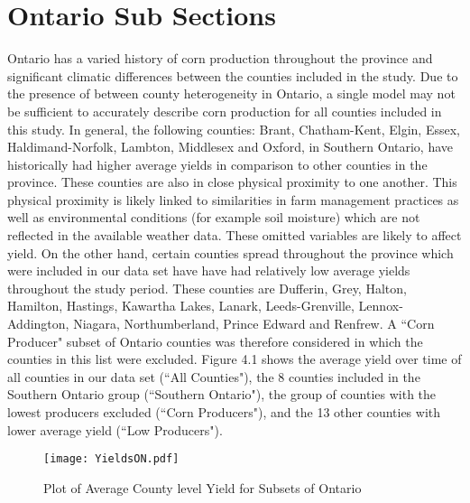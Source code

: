 \section{Ontario Sub Sections}


Ontario has a varied history of corn production throughout the province and significant climatic differences between the counties included in the study\citep{tolhurst2015cold}. Due to the presence of between county heterogeneity in Ontario, a single model may not be sufficient to accurately describe corn production for all counties included in this study. In general, the following counties: Brant, Chatham-Kent, Elgin, Essex, Haldimand-Norfolk, Lambton, Middlesex and Oxford, in Southern Ontario, have historically had higher average yields in comparison to other counties in the province. These counties are also in close physical proximity to one another. This physical proximity is likely linked to similarities in  farm management practices as well as environmental conditions (for example soil moisture) which are not reflected in the available weather data. These omitted variables are likely to affect yield. On the other hand, certain counties spread throughout the province which were included in our data set have have had relatively low average yields throughout the study period. These counties are Dufferin, Grey, Halton, Hamilton, Hastings, Kawartha Lakes, Lanark, Leeds-Grenville, Lennox-Addington, Niagara, Northumberland, Prince Edward and Renfrew. A ``Corn Producer" subset of Ontario counties was therefore considered in which the counties in this list were excluded. Figure 4.1 shows the average yield over time of all counties in our data set (``All Counties"), the 8 counties included in the Southern Ontario group (``Southern Ontario"), the group of counties with the lowest producers excluded (``Corn Producers"), and the 13 other counties with lower average yield (``Low Producers"). 


\begin{figure}[H]
\centering
 \texttt{[image: YieldsON.pdf]}
    \caption{Plot of Average County level Yield for Subsets of Ontario}
    \end{figure}



